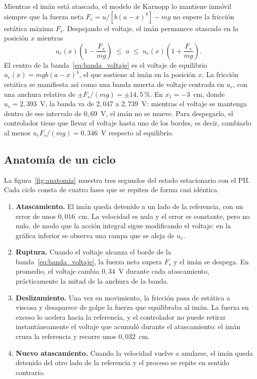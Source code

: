 Mientras el imán está atascado, el modelo de Karnopp lo mantiene inmóvil siempre que la fuerza neta $F_e = u/[b(a-x)^4] - mg$ no supere la fricción estática máxima $F_s$. Despejando el voltaje, el imán permanece atascado en la posición $x$ mientras
\begin{equation}
u_e(x)\left(1-\frac{F_s}{mg}\right) \;\le\; u \;\le\; u_e(x)\left(1+\frac{F_s}{mg}\right) .
\label{eq:banda_voltaje}
\end{equation}
El centro de la banda~\eqref{eq:banda_voltaje} es el voltaje de equilibrio $u_e(x)=mgb(a-x)^4$, el que sostiene al imán en la posición $x$. La fricción estática se manifiesta así como una banda muerta de voltaje centrada en $u_e$, con una anchura relativa de $\pm F_s/(mg)=\pm14{,}5$\,\%. En $x_1=-3$~cm, donde $u_e=2{,}393$~V, la banda va de $2{,}047$ a $2{,}739$~V: mientras el voltaje se mantenga dentro de ese intervalo de $0{,}69$~V, el imán no se mueve. Para despegarlo, el controlador tiene que llevar el voltaje hasta uno de los bordes, es decir, cambiarlo al menos $u_e F_s/(mg)=0{,}346$~V respecto al equilibrio.

\subsection{Anatomía de un ciclo}

La figura~\ref{fig:anatomia} muestra tres segundos del estado estacionario con el PII. Cada ciclo consta de cuatro fases que se repiten de forma casi idéntica.

\begin{enumerate}
  \item \textbf{Atascamiento.} El imán queda detenido a un lado de la referencia, con un error de unos $0{,}016$~cm. La velocidad es nula y el error es constante, pero no nulo, de modo que la acción integral sigue modificando el voltaje: en la gráfica inferior se observa una rampa que se aleja de $u_e$.
  \item \textbf{Ruptura.} Cuando el voltaje alcanza el borde de la banda~\eqref{eq:banda_voltaje}, la fuerza neta supera $F_s$ y el imán se despega. En promedio, el voltaje cambia $0{,}34$~V durante cada atascamiento, prácticamente la mitad de la anchura de la banda.
  \item \textbf{Deslizamiento.} Una vez en movimiento, la fricción pasa de estática a viscosa y desaparece de golpe la fuerza que equilibraba al imán. La fuerza en exceso lo acelera hacia la referencia, y el controlador no puede retirar instantáneamente el voltaje que acumuló durante el atascamiento: el imán cruza la referencia y recorre unos $0{,}032$~cm.
  \item \textbf{Nuevo atascamiento.} Cuando la velocidad vuelve a anularse, el imán queda detenido del otro lado de la referencia y el proceso se repite en sentido contrario.
\end{enumerate}

